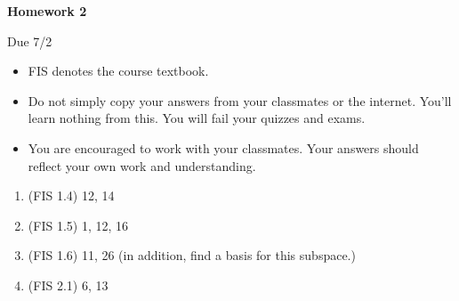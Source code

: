 \documentclass{article}
\begin{document}
\begin{center}
    {\bf Homework 2}
    
    Due 7/2
\end{center}

\begin{itemize}
    \item 
        FIS denotes the course textbook.
    \item
        Do not simply copy your answers from your classmates or the internet.
        You'll learn nothing from this. You will fail your quizzes and exams.
    \item
        You are encouraged to work with your classmates. Your answers
        should reflect your own work and understanding.
\end{itemize}

\begin{enumerate}
    \item
        (FIS 1.4) 12, 14
    \item
        (FIS 1.5) 1, 12, 16
    \item
        (FIS 1.6) 11, 26 (in addition, find a basis for this subspace.)
    \item
        (FIS 2.1) 6, 13
\end{enumerate}
    
\end{document}
